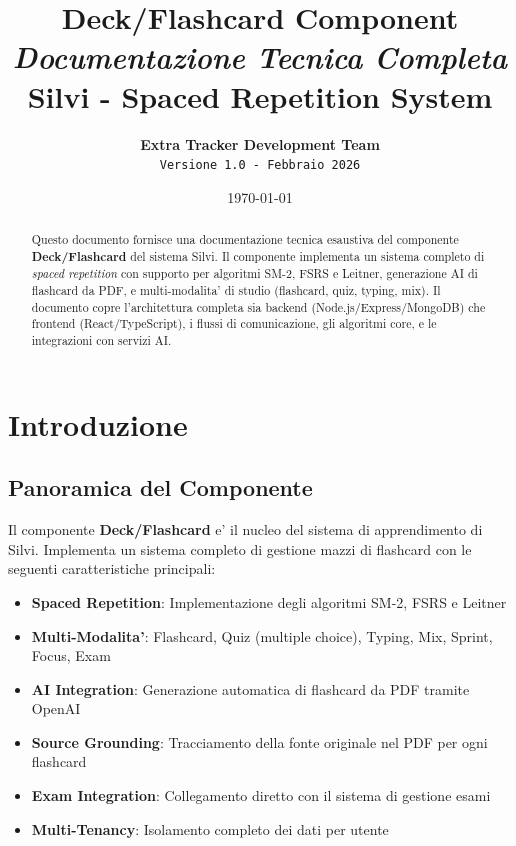 \documentclass[11pt,a4paper]{article}
\title{
    \Huge\textbf{Deck/Flashcard Component}\\[0.5em]
    \Large\textit{Documentazione Tecnica Completa}\\[1em]
    \large Silvi - Spaced Repetition System
}
\author{
    \textbf{Extra Tracker Development Team}\\
    \texttt{Versione 1.0 - Febbraio 2026}
}
\date{\today}
\begin{document}
\maketitle
\thispagestyle{empty}

\vfill

\begin{abstract}
\noindent
Questo documento fornisce una documentazione tecnica esaustiva del componente \textbf{Deck/Flashcard} del sistema Silvi. Il componente implementa un sistema completo di \textit{spaced repetition} con supporto per algoritmi SM-2, FSRS e Leitner, generazione AI di flashcard da PDF, e multi-modalita' di studio (flashcard, quiz, typing, mix). Il documento copre l'architettura completa sia backend (Node.js/Express/MongoDB) che frontend (React/TypeScript), i flussi di comunicazione, gli algoritmi core, e le integrazioni con servizi AI.
\end{abstract}

\vfill
\newpage

\tableofcontents
\newpage

\section{Introduzione}\label{sec:intro}

\subsection{Panoramica del Componente}

Il componente \textbf{Deck/Flashcard} e' il nucleo del sistema di apprendimento di Silvi. Implementa un sistema completo di gestione mazzi di flashcard con le seguenti caratteristiche principali:

\begin{itemize}[leftmargin=*]
    \item \textbf{Spaced Repetition}: Implementazione degli algoritmi SM-2, FSRS e Leitner
    \item \textbf{Multi-Modalita'}: Flashcard, Quiz (multiple choice), Typing, Mix, Sprint, Focus, Exam
    \item \textbf{AI Integration}: Generazione automatica di flashcard da PDF tramite OpenAI
    \item \textbf{Source Grounding}: Tracciamento della fonte originale nel PDF per ogni flashcard
    \item \textbf{Exam Integration}: Collegamento diretto con il sistema di gestione esami
    \item \textbf{Multi-Tenancy}: Isolamento completo dei dati per utente
\end{itemize}
\end{document}
